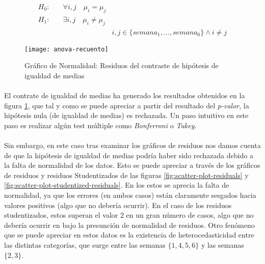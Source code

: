 \documentclass[11pt]{article}
\begin{document}
      \begin{align*}
        H_0:& \quad \forall i,j \quad \mu_{i} = \mu_{j} & \\
        H_1:& \quad \exists i,j \quad \mu_{i} \neq \mu_{j} & \\
        & & i,j \in \{semana_1,...,semana_6\} \land i \neq j
      \end{align*}

      \begin{figure}[!h]
        \centering
        \texttt{[image: anova-recuento]}
        \caption{Gráfico de Normalidad: Residuos del contraste de hipótesis de igualdad de medias}
        \label{img:anova-recuento}
      \end{figure}

      \paragraph{}
      El contrate de igualdad de medias ha generado los resultados obtenidos en la figura \ref{img:anova-recuento}, que tal y como se puede apreciar a partir del resultado del \emph{p-valor}, la hipótesis nula (de igualdad de medias) es rechazada. Un paso intuitivo en este paso es realizar algún test múltiple como \emph{Bonferroni} o \emph{Tukey}.

      \paragraph{}
      Sin embargo, en este caso tras examinar los gráficos de residuos nos damos cuenta de que la hipótesis de igualdad de medias podría haber sido rechazada debido a la falta de normalidad de los datos. Esto se puede apreciar a través de los gráficos de residuos y residuos Studentizados de las figuras \ref{fig:scatter-plot-residuals} y \ref{fig:scatter-plot-studentized-residuals}. En los estos se aprecia la falta de normalidad, ya que los errores (en ambos casos) están claramente sesgados hacia valores positivos (algo que no debería ocurrir). En el caso de los residuos studentizados, estos superan el valor $2$ en un gran número de casos, algo que no debería ocurrir en bajo la presunción de normalidad de residuos. Otro fenómeno que se puede apreciar en estos datos es la existencia de heterocedasticidad entre las distintas categorías, que surge entre las semanas $\{ 1, 4, 5, 6\}$ y las semanas $\{ 2, 3\}$.
\end{document}
